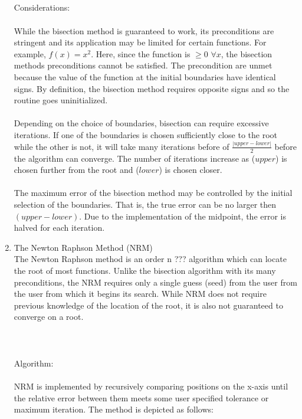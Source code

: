 \documentclass{report}
\begin{document}
\begin{enumerate}
\\
\\
\\
\\
Considerations: 
\\
\\While the bisection method is guaranteed to work, its preconditions are stringent and its application may be limited for certain functions. For example, $f(x)=x^2$. Here, since the function is $\geq0$ $\forall x$, the bisection methods preconditions cannot be satisfied. The precondition are unmet because the value of the function at the initial boundaries have identical signs. By definition, the bisection method requires opposite signs and so the routine goes uninitialized.
\\
\\ Depending on the choice of boundaries, bisection can require excessive iterations. If one of the boundaries is chosen sufficiently close to the root while the other is not, it will take many iterations before of $\frac{\left|upper-lower\right|}{2}$ before the algorithm can converge. The number of iterations increase as ($upper$) is chosen further from the root and ($lower$) is chosen closer.  
\\
\\The maximum error of the bisection method may be controlled by the initial selection of the boundaries. That is, the true error can be no larger then $(upper-lower)$. Due to the implementation of the midpoint, the error is halved for each iteration. 
\\
\item The Newton Raphson Method (NRM)
\\
The Newton Raphson method is an order n ??? algorithm which can locate the root of most functions. Unlike the bisection algorithm with its many preconditions, the NRM requires only a single guess (seed) from the user from the user from which it begins its search. While NRM does not require previous knowledge of the location of the root, it is also not guaranteed to converge on a root.
\\
\\
\\\\Algorithm:  
\\
\\NRM is implemented by recursively comparing positions on the x-axis until the relative error between them meets some user specified tolerance or maximum iteration. The method is depicted as follows:
\\

\end{enumerate}
\end{document}
